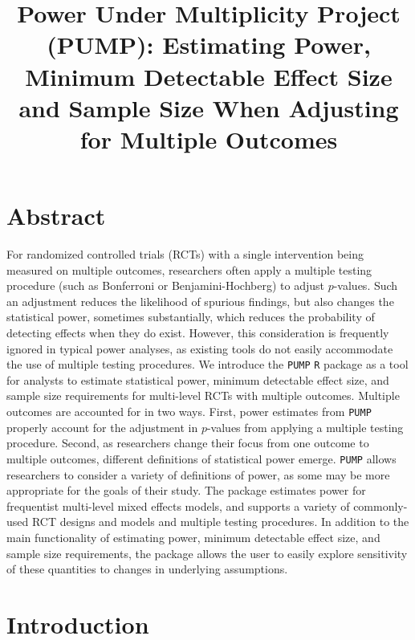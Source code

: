 \documentclass[
]{article}
\title{Power Under Multiplicity Project (PUMP): Estimating Power,
Minimum Detectable Effect Size and Sample Size When Adjusting for
Multiple Outcomes}
\author{}
\date{\vspace{-2.5em}}
\begin{document}
\maketitle

\doublespacing

\section*{Abstract}

For randomized controlled trials (RCTs) with a single intervention being
measured on multiple outcomes, researchers often apply a multiple
testing procedure (such as Bonferroni or Benjamini-Hochberg) to adjust
\(p\)-values. Such an adjustment reduces the likelihood of spurious
findings, but also changes the statistical power, sometimes
substantially, which reduces the probability of detecting effects when
they do exist. However, this consideration is frequently ignored in
typical power analyses, as existing tools do not easily accommodate the
use of multiple testing procedures. We introduce the \texttt{PUMP}
\texttt{R} package as a tool for analysts to estimate statistical power,
minimum detectable effect size, and sample size requirements for
multi-level RCTs with multiple outcomes. Multiple outcomes are accounted
for in two ways. First, power estimates from \texttt{PUMP} properly
account for the adjustment in \(p\)-values from applying a multiple
testing procedure. Second, as researchers change their focus from one
outcome to multiple outcomes, different definitions of statistical power
emerge. \texttt{PUMP} allows researchers to consider a variety of
definitions of power, as some may be more appropriate for the goals of
their study. The package estimates power for frequentist multi-level
mixed effects models, and supports a variety of commonly-used RCT
designs and models and multiple testing procedures. In addition to the
main functionality of estimating power, minimum detectable effect size,
and sample size requirements, the package allows the user to easily
explore sensitivity of these quantities to changes in underlying
assumptions.

\section{Introduction}
\label{sec:intro}
\end{document}
